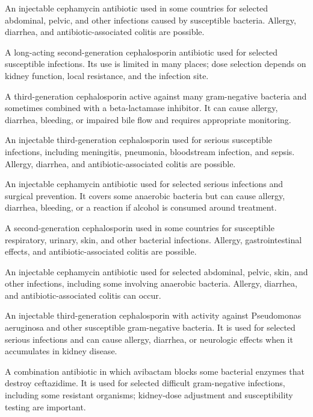  An injectable cephamycin antibiotic used in some countries for selected abdominal, pelvic, and other infections caused by susceptible bacteria. Allergy, diarrhea, and antibiotic-associated colitis are possible.

 A long-acting second-generation cephalosporin antibiotic used for selected susceptible infections. Its use is limited in many places; dose selection depends on kidney function, local resistance, and the infection site.

 A third-generation cephalosporin active against many gram-negative bacteria and sometimes combined with a beta-lactamase inhibitor. It can cause allergy, diarrhea, bleeding, or impaired bile flow and requires appropriate monitoring.

 An injectable third-generation cephalosporin used for serious susceptible infections, including meningitis, pneumonia, bloodstream infection, and sepsis. Allergy, diarrhea, and antibiotic-associated colitis are possible.

 An injectable cephamycin antibiotic used for selected serious infections and surgical prevention. It covers some anaerobic bacteria but can cause allergy, diarrhea, bleeding, or a reaction if alcohol is consumed around treatment.

 A second-generation cephalosporin used in some countries for susceptible respiratory, urinary, skin, and other bacterial infections. Allergy, gastrointestinal effects, and antibiotic-associated colitis are possible.

 An injectable cephamycin antibiotic used for selected abdominal, pelvic, skin, and other infections, including some involving anaerobic bacteria. Allergy, diarrhea, and antibiotic-associated colitis can occur.

 An injectable third-generation cephalosporin with activity against Pseudomonas aeruginosa and other susceptible gram-negative bacteria. It is used for selected serious infections and can cause allergy, diarrhea, or neurologic effects when it accumulates in kidney disease.

 A combination antibiotic in which avibactam blocks some bacterial enzymes that destroy ceftazidime. It is used for selected difficult gram-negative infections, including some resistant organisms; kidney-dose adjustment and susceptibility testing are important.

